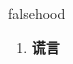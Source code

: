 
\begin{frame}
{\huge falsehood}
\begin{center}
\begin{enumerate}\Large
  \item \textbf{谎言}
\end{enumerate}
\end{center}
\end{frame}
